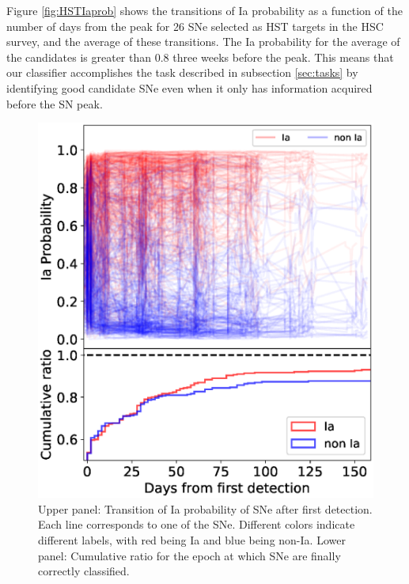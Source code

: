 \documentclass[proof]{pasj01}
\begin{document}
%
Figure \ref{fig:HSTIaprob} shows the transitions of Ia probability as a function of the number of days from the peak for 26 SNe selected as HST targets in the HSC survey, and the average of these transitions.
The Ia probability for the average of the candidates is greater than 0.8 three weeks before the peak.
This means that our classifier accomplishes the task described in subsection \ref{sec:tasks} by identifying good candidate SNe even when it only has information acquired before the SN peak.
%
\begin{figure}[htbp]
  \begin{center}
     \includegraphics[width=\columnwidth]{figures/n_observations_lastestday_200709.eps}
  \end{center}
  \caption{%
  Upper panel: Transition of Ia probability of SNe after first detection. Each line corresponds to one of the SNe. Different colors indicate different labels, with red being Ia and blue being non-Ia. Lower panel: Cumulative ratio for the epoch at which SNe are finally correctly classified.
  }%
  \label{fig:visualized_Ia_prob}
\end{figure}
\end{document}
